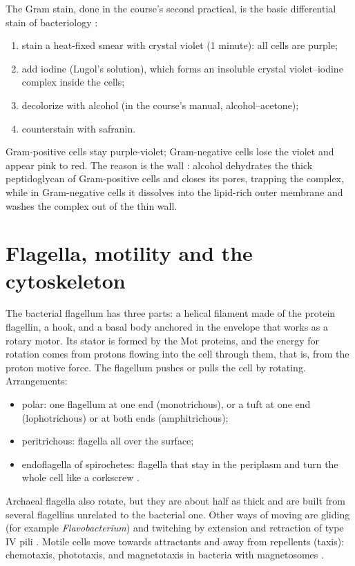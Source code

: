 The Gram stain, done in the course's second
practical, is the basic differential stain of
bacteriology \cite[Section
2.2]{madigan2012brock}:
\begin{enumerate}
\item stain a heat-fixed smear with crystal
violet (1 minute): all cells are purple;
\item add iodine (Lugol's solution), which
forms an insoluble crystal violet--iodine
complex inside the cells;
\item decolorize with alcohol (in the
course's manual, alcohol--acetone);
\item counterstain with safranin.
\end{enumerate}
Gram-positive cells stay purple-violet;
Gram-negative cells lose the violet and
appear pink to red. The reason is the wall
\cite[Section 3.7]{madigan2012brock}: alcohol
dehydrates the thick peptidoglycan of
Gram-positive cells and closes its pores,
trapping the complex, while in Gram-negative
cells it dissolves into the lipid-rich outer
membrane and washes the complex out of the
thin wall.

\section{Flagella, motility and the
cytoskeleton}
\label{section-motility}

The bacterial flagellum \cite[Section
3.13]{madigan2012brock} has three parts: a
helical filament made of the protein
flagellin, a hook, and a basal body anchored
in the envelope that works as a rotary motor.
Its stator is formed by the Mot proteins, and
the energy for rotation comes from protons
flowing into the cell through them, that is,
from the proton motive force. The flagellum
pushes or pulls the cell by rotating.
Arrangements:
\begin{itemize}
\item polar: one flagellum at one end
(monotrichous), or a tuft at one end
(lophotrichous) or at both ends
(amphitrichous);
\item peritrichous: flagella all over the
surface;
\item endoflagella of spirochetes: flagella
that stay in the periplasm and turn the whole
cell like a corkscrew \cite[Chapter
18]{madigan2012brock}.
\end{itemize}
Archaeal flagella also rotate, but they are
about half as thick and are built from
several flagellins unrelated to the bacterial
one. Other ways of moving are gliding (for
example \emph{Flavobacterium}) and twitching
by extension and retraction of type IV pili
\cite[Sections 3.13--3.14]{madigan2012brock}.
Motile cells move towards attractants and
away from repellents (taxis): chemotaxis,
phototaxis, and magnetotaxis in bacteria with
magnetosomes \cite[Section
3.15]{madigan2012brock}.

